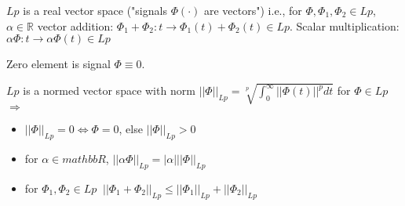 $Lp$ is a real vector space ("signals $\Phi(\cdot)$ are vectors") i.e., for 
$\Phi, \Phi_1, \Phi_2 \in Lp$, $\alpha \in \mathbb{R}$ vector addition:
$\Phi_1+\Phi_2:t \rightarrow \Phi_1(t)+\Phi_2(t) \in Lp$. Scalar multiplication:
$\alpha \Phi:t\rightarrow \alpha\Phi(t) \in Lp$

Zero element is signal $\Phi \equiv 0$.

$Lp$ is a normed vector space with norm $||\Phi||_{Lp}=\sqrt[p]{\int_0^\infty ||\Phi(t)||^p dt}$
for $\Phi \in Lp$ $\Rightarrow$
\begin{itemize}
 \item $||\Phi||_{Lp}=0 \iff \Phi=0$, else $||\Phi||_{Lp}>0$
 \item for $\alpha \in mathbb{R}$, $||\alpha\Phi||_{Lp}=|\alpha| ||\Phi||_{Lp}$
 \item for $\Phi_1, \Phi_2 \in Lp\ $ $||\Phi_1+\Phi_2||_{Lp} \le ||\Phi_1||_{Lp}+||\Phi_2||_{Lp}$
\end{itemize}